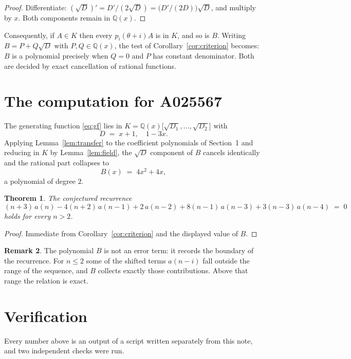 \documentclass[11pt,a4paper]{article}
\theoremstyle{plain}
\newtheorem{theorem}{Theorem}
\theoremstyle{definition}
\newtheorem{remark}[theorem]{Remark}
\begin{document}
\begin{proof}
Differentiate: $(\sqrt{D})'=D'/(2\sqrt{D})=\bigl(D'/(2D)\bigr)\sqrt{D}$, and multiply by
$x$. Both components remain in $\mathbb{Q}(x)$.
\end{proof}

Consequently, if $A\in K$ then every $p_{i}(\theta+i)A$ is in $K$, and so is $B$. Writing
$B=P+Q\sqrt{D}$ with $P,Q\in\mathbb{Q}(x)$, the test of Corollary~\ref{cor:criterion}
becomes: $B$ is a polynomial precisely when $Q=0$ and $P$ has constant denominator. Both
are decided by exact cancellation of rational functions.

\section{The computation for A025567}

The generating function \eqref{eq:gf} lies in $K=\mathbb{Q}(x)\bigl[\sqrt{D_{1}},\dots,\sqrt{D_{2}}\bigr]$ with
\[
D \;=\; x + 1,\quad 1 - 3 x .
\]
Applying Lemma~\ref{lem:transfer} to the coefficient polynomials of Section~1 and reducing
in $K$ by Lemma~\ref{lem:field}, the $\sqrt{D}$ component of $B$ cancels identically and
the rational part collapses to
\[
B(x)\;=\;4 x^{2} + 4 x ,
\]
a polynomial of degree $2$.

\begin{theorem}
The conjectured recurrence
\[
(n + 3)\,a(n) -  4 \left(n + 2\right)\,a(n-1) + 2\,a(n-2) + 8 \left(n - 1\right)\,a(n-3) + 3 \left(n - 3\right)\,a(n-4) \;=\;0
\]
holds for every $n>2$.
\end{theorem}

\begin{proof}
Immediate from Corollary~\ref{cor:criterion} and the displayed value of $B$.
\end{proof}

\begin{remark}
The polynomial $B$ is not an error term: it records the boundary of the recurrence. For
$n\le2$ some of the shifted terms $a(n-i)$ fall outside the range of the sequence,
and $B$ collects exactly those contributions. Above that range the relation is exact.
\end{remark}

\section{Verification}

Every number above is an output of a script written separately from this note, and two
independent checks were run.
\end{document}
